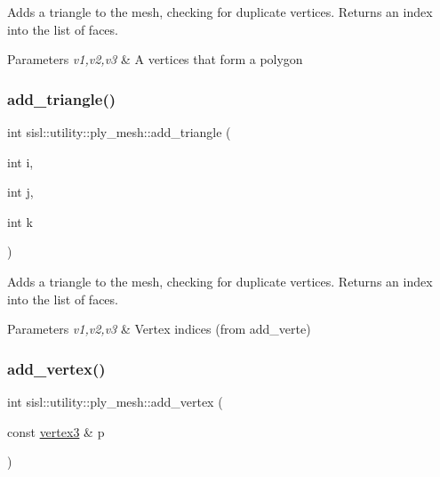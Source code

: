 Adds a triangle to the mesh, checking for duplicate vertices. Returns an index into the list of faces. 
\begin{DoxyParams}{Parameters}
{\em v1,v2,v3} & A vertices that form a polygon \\
\hline
\end{DoxyParams}
\mbox{\label{classsisl_1_1utility_1_1ply__mesh_a1cee19476c65b8f721d763116f7ed792}} 
\subsubsection{\texorpdfstring{add\+\_\+triangle()}{add\_triangle()}\hspace{0.1cm}{\footnotesize\ttfamily [2/2]}}
{\footnotesize\ttfamily int sisl\+::utility\+::ply\+\_\+mesh\+::add\+\_\+triangle (\begin{DoxyParamCaption}\item[{int}]{i,  }\item[{int}]{j,  }\item[{int}]{k }\end{DoxyParamCaption})\hspace{0.3cm}{\ttfamily [inline]}}

Adds a triangle to the mesh, checking for duplicate vertices. Returns an index into the list of faces. 
\begin{DoxyParams}{Parameters}
{\em v1,v2,v3} & Vertex indices (from add\+\_\+verte) \\
\hline
\end{DoxyParams}
\mbox{\label{classsisl_1_1utility_1_1ply__mesh_a133740c648ea0dfcc71b79f0c4737ca4}} 
\subsubsection{\texorpdfstring{add\+\_\+vertex()}{add\_vertex()}}
{\footnotesize\ttfamily int sisl\+::utility\+::ply\+\_\+mesh\+::add\+\_\+vertex (\begin{DoxyParamCaption}\item[{const \hyperlink{structsisl_1_1vertex3}{vertex3} \&}]{p }\end{DoxyParamCaption})\hspace{0.3cm}{\ttfamily [inline]}}

